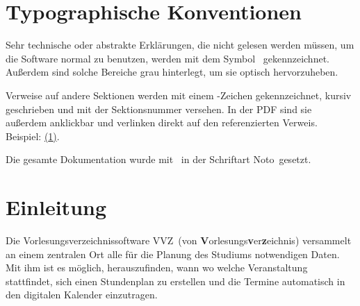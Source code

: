 \newcommand*{\fullref}[1]{\hyperref[{#1}]{%
\ExternalLink\textit{\nameref*{#1}} (\ref{#1})}} %





\maketitle\nocite{raffael}
\thispagestyle{empty}

\newpage
\ClearWallPaper

\tableofcontents

\newpage

\thispagestyle{empty}

\newpage

\section{Typographische Konventionen}
\label{typographie}

\begin{technisches}
Sehr technische oder abstrakte Erklärungen, die nicht gelesen werden müssen, um die Software
normal zu benutzen, werden mit dem Symbol \frq \mydbend\flq\ gekennzeichnet. Außerdem sind solche
Bereiche grau hinterlegt, um sie optisch hervorzuheben.
\end{technisches}

Verweise auf andere Sektionen werden mit einem \ExternalLink-Zeichen gekennzeichnet, kursiv geschrieben
und mit der Sektionsnummer versehen. In der PDF sind sie außerdem anklickbar und verlinken direkt auf
den referenzierten Verweis. Beispiel: \fullref{typographie}.

Die gesamte Dokumentation wurde mit \XeLaTeX\ in der Schriftart \frq Noto\flq\ gesetzt.

\section{Einleitung}

Die Vorlesungsverzeichnissoftware \frq VVZ\flq\ (von \textbf{V}orlesungs\textbf{v}er\textbf{z}eichnis)
versammelt an einem zentralen Ort alle
für die Planung des Studiums notwendigen Daten. Mit ihm ist es möglich, herauszufinden,
wann wo welche Veranstaltung stattfindet, sich einen Stundenplan zu erstellen und die 
Termine automatisch in den digitalen Kalender einzutragen.

